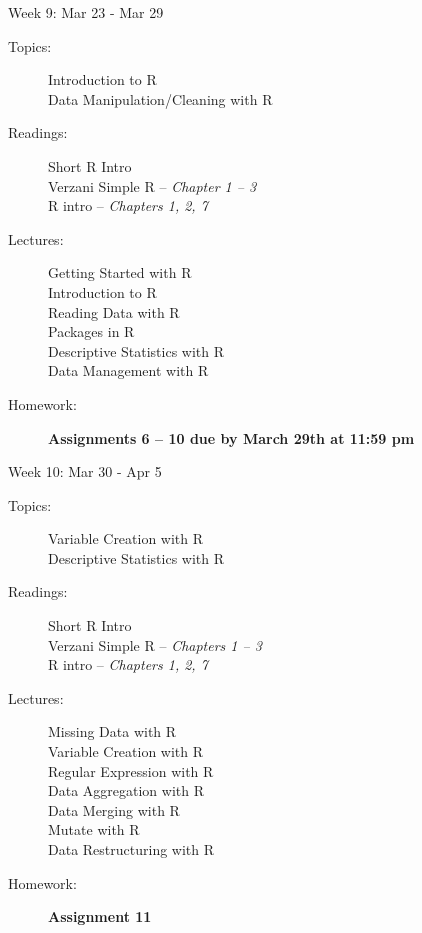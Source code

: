 \documentclass[11pt,article,oneside]{memoir}
\newcounter{schedule}
\begin{document}
\begin{schedule}{Week 9: Mar 23 - Mar 29}
\begin{description}
\item[Topics:] Introduction to R \\ Data Manipulation/Cleaning with R

\item[Readings:] Short R Intro \\ Verzani Simple R -- \textit{Chapter 1 -- 3} \\ R intro -- \textit{Chapters 1, 2, 7}

\item[Lectures:] Getting Started with R \\ Introduction to R \\ Reading Data with R \\ Packages in R \\ Descriptive Statistics with R \\ Data Management with R

\item[Homework:] \textbf{Assignments 6 -- 10 due by March 29th at 11:59 pm}

\end{description}
\end{schedule}
\begin{schedule}{Week 10: Mar 30 - Apr 5}
\begin{description}
\item[Topics:] Variable Creation with R \\ Descriptive Statistics with R

\item[Readings:] Short R Intro \\ Verzani Simple R -- \textit{Chapters 1 -- 3} \\ R intro -- \textit{Chapters 1, 2, 7}

\item[Lectures:] Missing Data with R \\ Variable Creation with R \\ Regular Expression with R  \\ Data Aggregation with R \\ Data Merging with R \\ Mutate with R \\ Data Restructuring with R

\item[Homework:] \textbf{Assignment 11}

\end{description}
\end{schedule}
\end{document}
